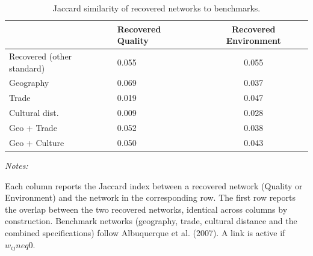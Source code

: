 \begin{table}[!h]
\centering
\caption{\label{tab:jaccard_similarity}Jaccard similarity of recovered networks to benchmarks.}
\centering
\fontsize{9}{11}\selectfont
\begin{threeparttable}
\begin{tabular}[t]{llc}
\toprule
  & Recovered Quality & Recovered Environment\\
\midrule
Recovered (other standard) & 0.055 & 0.055\\
Geography & 0.069 & 0.037\\
Trade & 0.019 & 0.047\\
Cultural dist. & 0.009 & 0.028\\
Geo + Trade & 0.052 & 0.038\\
\addlinespace
Geo + Culture & 0.050 & 0.043\\
\bottomrule
\end{tabular}
\begin{tablenotes}[para]
\item \textit{Notes:} 
\item Each column reports the Jaccard index between a recovered network (Quality or Environment) and the network in the corresponding row. The first row reports the overlap between the two recovered networks, identical across columns by construction. Benchmark networks (geography, trade, cultural distance and the combined specifications) follow Albuquerque et al. (2007). A link is active if $w_{ij} neq 0$.
\end{tablenotes}
\end{threeparttable}
\end{table}
